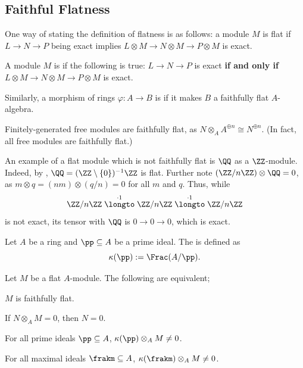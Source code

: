 \subsection{Faithful Flatness}
One way of stating the definition of flatness is as follows: a module $M$ is flat if $L\to N\to P$ being exact implies $L\otimes M\to N\otimes M\to P\otimes M$ is exact.
\begin{definition}
    A module $M$ is  if the following is true: $L\to N\to P$ is exact \textbf{if and only if} $L\otimes M\to N\otimes M\to P\otimes M$ is exact.

    Similarly, a morphism of rings $\varphi : A\to B$
    is  if it makes $B$
    a faithfully flat $A$-algebra.
\end{definition}
\begin{example}
    Finitely-generated free modules are faithfully flat, as $N\otimes_A A^{\oplus n} \cong N^{\oplus n}$. (In fact, all free modules are faithfully flat.)

    An example of a flat module which is not faithfully flat is $\QQ$ as a $\ZZ$-module. Indeed, by , $\QQ = (\ZZ\setminus \{0\})^{-1}\ZZ$ is flat. Further note $(\ZZ/n\ZZ)\otimes \QQ = 0$, as $m\otimes q = (nm)\otimes (q/n) = 0$ for all $m$ and $q$. Thus, while \[\ZZ/n\ZZ\stackrel{\cdot 1}\longto \ZZ/ n\ZZ\stackrel{\cdot 1}\longto \ZZ/n\ZZ\] 
    is not exact, its tensor with $\QQ$ is $0\to 0\to 0$, which is exact.
\end{example}
\begin{definition}
    Let $A$ be a ring and $\pp\subseteq A$ be a prime ideal. The  is defined as
    \[\kappa(\pp) := \Frac(A/\pp).\]
\end{definition}
\begin{theorem}
    \label{thm:faithful_flat_conditions}
    Let $M$ be a flat $A$-module. The following are equivalent;
    \begin{alphenum}
        \item $M$ is faithfully flat.
        \item If $N\otimes_A M=0$, then $N=0$.
        \item For all prime ideals $\pp\subseteq A$, $\kappa(\pp)\otimes_A M \neq 0$.
        \item For all maximal ideals $\frakm\subseteq A$, $\kappa(\frakm)\otimes_A M \neq 0$.
    \end{alphenum}
\end{theorem}
